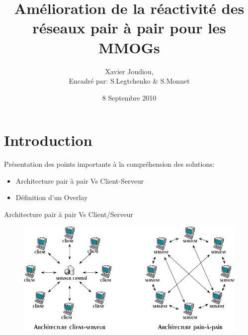 \documentclass{beamer}
\title{Amélioration de la réactivité des réseaux pair à pair pour les MMOGs}
\author{Xavier Joudiou,\\\tiny{Encadré par: S.Legtchenko \& S.Monnet}}\institute{Université Paris VI, Master SAR}
\date{8 Septembre 2010}
\begin{document}
  \begin{frame}
  \maketitle
  \end{frame}


  \begin{frame}
  \tableofcontents
  \end{frame}

  \section{Introduction}
  \begin{frame}
  	Présentation des points importants à la compréhension des solutions:\\
	\begin{itemize}
		\item Architecture pair à pair Vs Client-Serveur\\
		\item Définition d'un Overlay\\
	\end{itemize}
  \end{frame}

  \begin{frame}
	Architecture pair à pair Vs Client/Serveur\\
	\begin{figure}
	\includegraphics[scale=0.3]{./Ressources/Images/p2p-85145.png}\\
        \label{P2PvsClServ}
        \end{figure}
  \end{frame}
  
\end{document}

